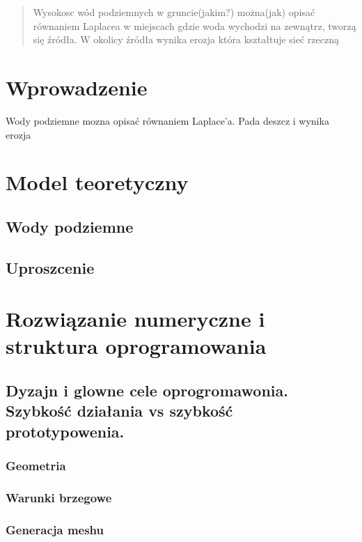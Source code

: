 \documentclass[]{pracamgr}
\begin{document}
\maketitle

\begin{abstract}
  Wysokosc wód podziemnych w gruncie(jakim?) można(jak) opisać równaniem Laplacea w miejscach gdzie woda wychodzi na zewnątrz, tworzą się
  źródła. W okolicy źródła wynika erozja która kształtuje sieć rzeczną
\end{abstract}

\tableofcontents

\chapter*{Wprowadzenie}

Wody podziemne mozna opisać równaniem Laplace'a. Pada deszcz i wynika erozja




\chapter{Model teoretyczny}
\section{Wody podziemne}
\section{Uproszcenie}

\chapter{Rozwiązanie numeryczne i struktura oprogramowania}
\section{Dyzajn i glowne cele oprogromawonia. Szybkość działania vs szybkość prototypowenia.}
\subsection{Geometria}
\subsection{Warunki brzegowe}
\subsection{Generacja meshu}
\end{document}
